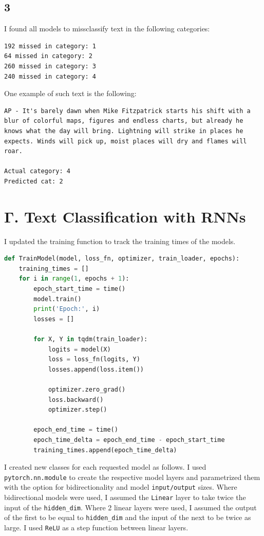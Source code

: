 \documentclass[8pt,a4paper]{report}%
\begin{document}

\subsection*{3}

I found all models to missclassify text in the following categories:

\begin{lstlisting}
192 missed in category: 1
64 missed in category: 2
260 missed in category: 3
240 missed in category: 4
\end{lstlisting}

One example of such text is the following:

\begin{lstlisting}
AP - It's barely dawn when Mike Fitzpatrick starts his shift with a
blur of colorful maps, figures and endless charts, but already he
knows what the day will bring. Lightning will strike in places he
expects. Winds will pick up, moist places will dry and flames will
roar.

Actual category: 4
Predicted cat: 2

\end{lstlisting}


\section*{Γ. Text Classification with RNNs}

I updated the training function to track the training times of the models.

\begin{lstlisting}[language=Python]
def TrainModel(model, loss_fn, optimizer, train_loader, epochs):
    training_times = []
    for i in range(1, epochs + 1):
        epoch_start_time = time()
        model.train()
        print('Epoch:', i)
        losses = []

        for X, Y in tqdm(train_loader):
            logits = model(X)
            loss = loss_fn(logits, Y)
            losses.append(loss.item())

            optimizer.zero_grad()
            loss.backward()
            optimizer.step()

        epoch_end_time = time()
        epoch_time_delta = epoch_end_time - epoch_start_time
        training_times.append(epoch_time_delta)
\end{lstlisting}

I created new classes for each requested model as follows. I used \lstinline{pytorch.nn.module} to create the respective model layers and parametrized them with the option for bidirectionality and model \lstinline{input/output} sizes. Where bidirectional models were used, I assumed the \lstinline{Linear} layer to take twice the input of the \lstinline{hidden_dim}. Where 2 linear layers were used, I assumed the output of the first to be equal to \lstinline{hidden_dim} and the input of the next to be twice as large. I used \lstinline{ReLU} as a step function between linear layers.
\end{document}
